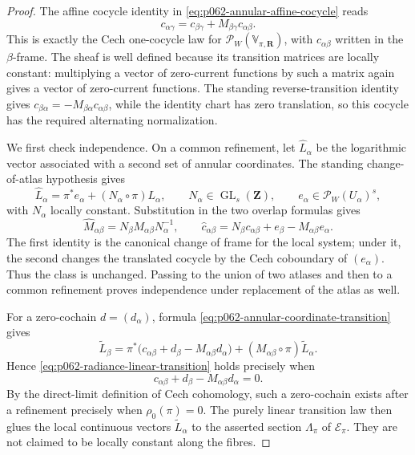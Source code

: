 \begin{proof}
The affine cocycle identity in
\eqref{eq:p062-annular-affine-cocycle} reads
\[
 c_{\alpha\gamma}
 =c_{\beta\gamma}+M_{\beta\gamma}c_{\alpha\beta}.
\]
This is exactly the Cech one-cocycle law for
$\mathscr P_W(\mathbb V_{\pi,\mathbf R})$, with
$c_{\alpha\beta}$ written in the $\beta$-frame.  The sheaf is well defined
because its transition matrices are locally constant: multiplying a vector
of zero-current functions by such a matrix again gives a vector of
zero-current functions.  The standing reverse-transition identity gives
$c_{\beta\alpha}=-M_{\beta\alpha}c_{\alpha\beta}$, while the identity chart
has zero translation, so this cocycle has the required alternating
normalization.

We first check independence.  On a common refinement, let
$\widehat L_\alpha$ be the logarithmic vector associated with a second set
of annular coordinates.  The standing change-of-atlas hypothesis gives
\[
 \widehat L_\alpha=\pi^*e_\alpha+(N_\alpha\circ\pi)L_\alpha,
 \qquad
 N_\alpha\in\operatorname{GL}_s(\mathbf Z),
 \qquad
 e_\alpha\in\mathscr P_W(U_\alpha)^s,
\]
with $N_\alpha$ locally constant.  Substitution in the two overlap formulas
gives
\[
 \widehat M_{\alpha\beta}
 =N_\beta M_{\alpha\beta}N_\alpha^{-1},
 \qquad
 \widehat c_{\alpha\beta}
 =N_\beta c_{\alpha\beta}
   +e_\beta-\widehat M_{\alpha\beta}e_\alpha.
\]
The first identity is the canonical change of frame for the local system;
under it, the second changes the translated cocycle by the Cech coboundary
of $(e_\alpha)$.  Thus the class is unchanged.  Passing to the union of two
atlases and then to a common refinement proves independence under
replacement of the atlas as well.

For a zero-cochain $d=(d_\alpha)$, formula
\eqref{eq:p062-annular-coordinate-transition} gives
\[
 \widetilde L_\beta
 =\pi^*\bigl(c_{\alpha\beta}+d_\beta
                 -M_{\alpha\beta}d_\alpha\bigr)
  +(M_{\alpha\beta}\circ\pi)\widetilde L_\alpha.
\]
Hence \eqref{eq:p062-radiance-linear-transition} holds precisely when
\begin{equation}
\label{eq:p062-radiance-coboundary}
 c_{\alpha\beta}+d_\beta-M_{\alpha\beta}d_\alpha=0.
\end{equation}
By the direct-limit definition of Cech cohomology, such a zero-cochain
exists after a refinement precisely when $\rho_0(\pi)=0$.  The purely
linear transition law then glues the local continuous vectors
$\widetilde L_\alpha$ to the asserted section $\Lambda_\pi$ of
$\mathcal E_\pi$.  They are not claimed to be locally constant along the
fibres.


\end{proof}
